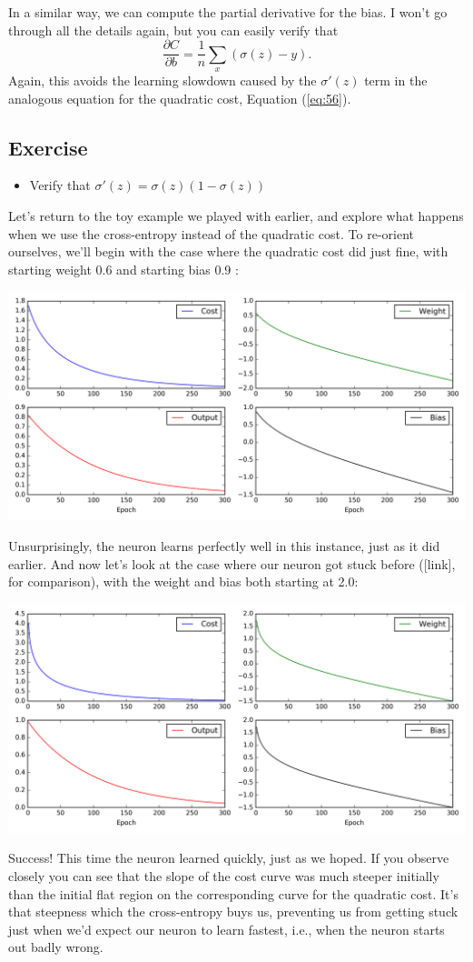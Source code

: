 \documentclass[a4paper,twoside,10pt]{book}
\begin{document}
In a similar way, we can compute the partial derivative for the bias. I won't go through all the details again, but you can easily verify that
\begin{equation}
	\frac{\partial C}{\partial b} = \frac{1}{n} \sum_x (\sigma(z)-y).
	\label{eq:62}
\end{equation}
Again, this avoids the learning slowdown caused by the $\sigma'(z)$ term in the analogous equation for the quadratic cost, Equation (\ref{eq:56}).
\subsection*{Exercise}
\begin{itemize}
	\item Verify that $\sigma'(z) = \sigma(z)(1-\sigma(z))$
\end{itemize}
Let's return to the toy example we played with earlier, and explore what happens when we use the cross-entropy instead of the quadratic cost. To re-orient ourselves, we'll begin with the case where the quadratic cost did just fine, with starting weight 0.6 and starting bias 0.9
:
\begin{center}%
	\includegraphics[width=0.75\linewidth]{./figures/ch3/animation_33}
\end{center}
Unsurprisingly, the neuron learns perfectly well in this instance, just as it did earlier. And now let's look at the case where our neuron got stuck before ([link], for comparison), with the weight and bias both starting at 2.0:
\begin{center}%
	\includegraphics[width=0.75\linewidth]{./figures/ch3/animation_34}
\end{center}
Success! This time the neuron learned quickly, just as we hoped. If you observe closely you can see that the slope of the cost curve was much steeper initially than the initial flat region on the corresponding curve for the quadratic cost. It's that steepness which the cross-entropy buys us, preventing us from getting stuck just when we'd expect our neuron to learn fastest, i.e., when the neuron starts out badly wrong.
\end{document}
